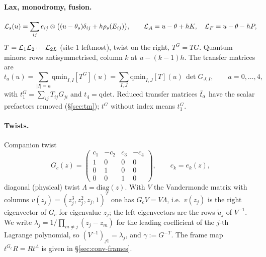 \paragraph{Lax, monodromy, fusion.}
\begin{equation}
 \mathcal L_s(u)=\sum_{ij}e_{ij}\otimes\big((u-\theta_s)\delta_{ij}+h\rho_s(E_{ij})\big),\qquad
 \mathcal L_A=u-\theta+hK,\quad \mathcal L_F=u-\theta-hP,
\end{equation}
$T=\mathcal L_1\mathcal L_2\cdots\mathcal L_{2L}$ (site 1 leftmost), twist on the right, $T^G=TG$. Quantum minors: rows antisymmetrised, column
$k$ at $u-(k-1)h$. The transfer matrices are
\begin{equation}
 t_a(u)=\sum_{|I|=a}\mathrm{qmin}_{I,I}[T^G](u)=\sum_{I,J}\mathrm{qmin}_{I,J}[T](u)\,\det G_{J,I},\qquad a=0,\dots,4,
\end{equation}
with $t_1^G=\sum_{ij}T_{ij}G_{ji}$ and $t_4=\mathrm{qdet}$. Reduced transfer matrices $\bar t_a$ have the scalar prefactors
removed (\S\ref{sec:tm}); $t^G$ without index means $t_1^G$.

\paragraph{Twists.} Companion twist
\begin{equation}
 G_c(z)=\begin{pmatrix}c_1&-c_2&c_3&-c_4\\1&0&0&0\\0&1&0&0\\0&0&1&0\end{pmatrix},\qquad c_k=e_k(z),
\end{equation}
diagonal (physical) twist $\Lambda=\mathrm{diag}(z)$. With $V$ the Vandermonde matrix with columns
$v(z_j)=(z_j^3,z_j^2,z_j,1)^T$ one has $G_cV=V\Lambda$, i.e.\ $v(z_j)$ is the right eigenvector of $G_c$ for eigenvalue $z_j$;
the left eigenvectors are the rows $\tilde u_j$ of $V^{-1}$. We write $\lambda_j=1/\prod_{m\ne j}(z_j-z_m)$ for the leading
coefficient of the $j$-th Lagrange polynomial, so $(V^{-1})_{j1}=\lambda_j$, and $\gamma:=G^{-T}$. The frame map
$t^{G_c}R=Rt^\Lambda$ is given in \S\ref{sec:conv-frames}.

